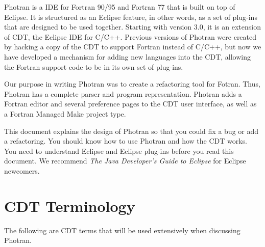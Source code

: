 
Photran is a IDE for Fortran 90/95 and Fortran 77 that is built on top of
Eclipse.  It is structured as an Eclipse feature, in other words,
as a set of plug-ins that are designed to be used together.
Starting with version 3.0, it is an extension of CDT, the Eclipse IDE for
C/C++.  Previous versions of Photran were created by hacking a copy of the
CDT to support Fortran instead of C/C++, but now we have developed a
mechanism for adding new languages into the CDT, allowing the Fortran support
code to be in its own set of plug-ins.

Our purpose in writing Photran was to create a refactoring tool for Fotran.
Thus, Photran has a complete parser and program representation.  Photran
adds a Fortran editor and several preference pages to the CDT user interface,
as well as a Fortran Managed Make project type.

This document explains the design of Photran so that you could fix a bug or
add a refactoring.  You should know how to use Photran and how
the CDT works.  You need to understand Eclipse and Eclipse plug-ins
before you read this document.  We recommend \textit{The Java
Developer's Guide to Eclipse} for Eclipse newcomers.

\section{CDT Terminology}

The following are CDT terms that will be used extensively when discussing
Photran.

